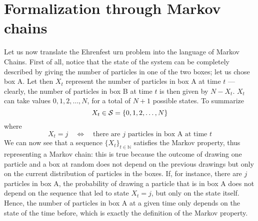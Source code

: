 \section{Formalization through Markov chains}
Let us now translate the Ehrenfest urn problem into the language of Markov Chains. 
First of all, notice that the state of the system can be completely described by giving the number of particles in one of the two boxes; let us chose box A. Let then $X_t$ represent the number of particles in box A at time $t$ --- clearly, the number of particles in box B at time $t$ is then given by $N - X_t$. $X_t$ can take values $0, 1, 2, \dots, N$, for a total of $N + 1$ possible states. To summarize
\begin{equation}
    X_t \in \mathcal{S} = \{ 0, 1, 2, \dots, N \}
\end{equation}
where
\begin{equation}
    X_t = j \quad \Leftrightarrow \quad \text{there are $j$ particles in box A at time $t$}
\end{equation}
We can now see that a sequence $\{X_t\}_{t\in \mathbb{N}}$ satisfies the Markov property, thus representing a Markov chain: this is true because the outcome of drawing one particle and a box at random does not depend on the previous drawings but only on the current distribution of particles in the boxes. If, for instance, there are $j$ particles in box A, the probability of drawing a particle that is in box A does not depend on the sequence that led to state $X_t = j$, but only on the state itself. Hence, the number of particles in box A at a given time only depends on the state of the time before, which is exactly the definition of the Markov property.

